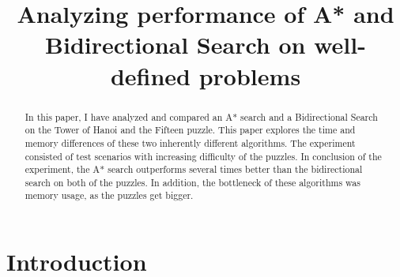 \documentclass[conference]{IEEEtran}
\begin{document}
%
\title{Analyzing performance of A* and Bidirectional Search on well-defined problems}

\author{
}

\maketitle

\begin{abstract}
In this paper, I have analyzed and compared an A* search and a Bidirectional Search on the Tower of Hanoi and the Fifteen puzzle. This paper explores the time and memory differences of these two inherently different algorithms. The experiment consisted of test scenarios with increasing difficulty of the puzzles. In conclusion of the experiment, the A* search outperforms several times better than the bidirectional search on both of the puzzles. In addition, the bottleneck of these algorithms was memory usage, as the puzzles get bigger.
\end{abstract}



%
\IEEEpeerreviewmaketitle

\section{Introduction}
\end{document}
